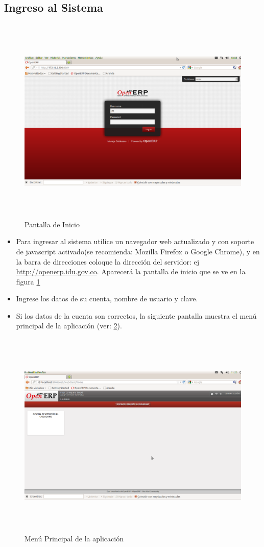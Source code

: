 \subsection{Ingreso al Sistema}
\begin{figure}[H]
 \centering
 \includegraphics[width=17cm,height=10cm]{./Imagenes/Login.png}
 \caption{Pantalla de Inicio}
 \label{fig:login}
\end{figure}


\begin{itemize}
 \item Para ingresar al sistema utilice un navegador web actualizado y con soporte de javascript activado(se recomienda: Mozilla Firefox o Google Chrome), y en la barra de direcciones coloque la dirección del servidor: ej \underline{http://openerp.idu.gov.co}. Aparecerá la pantalla
 de inicio que se ve en la figura \ref{fig:login}
 \item Ingrese los datos de su cuenta, nombre de usuario y clave.
 \item Si los datos de la cuenta son correctos, la siguiente pantalla muestra el menú principal de la aplicación (ver: \ref{fig:menumain}).
\end{itemize}


\begin{figure}[H]
 \centering
 \includegraphics[width=17cm,height=10cm]{./Imagenes/menumain.png}
 \caption{Menú Principal de la aplicación}
 \label{fig:menumain}
\end{figure}
